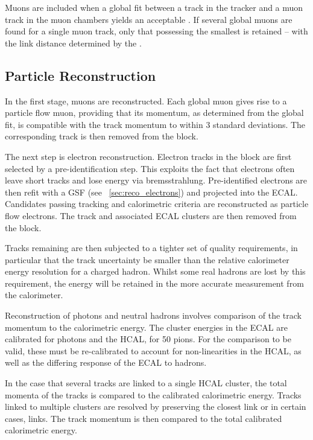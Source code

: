 Muons are included when a global fit between a track in the tracker and a muon
track in the muon chambers yields an acceptable \chisq. If several global muons
are found for a single muon track, only that possessing the smallest \chisq is
retained -- with the link distance determined by the \chisq.

\subsection{Particle Reconstruction}
In the first stage, muons are reconstructed. Each global muon gives rise to a
particle flow muon, providing that its momentum, as determined from the global
fit, is compatible with the track momentum to within 3 standard deviations. The
corresponding track is then removed from the block.

The next step is electron reconstruction. Electron tracks in the block are first
selected by a pre-identification step. This exploits the fact that electrons
often leave short tracks and lose energy via bremsstrahlung. Pre-identified
electrons are then refit with a \ac{GSF} (see \sec~\ref{sec:reco_electrons}) and
projected into the \ac{ECAL}.  Candidates passing tracking and calorimetric
criteria are reconstructed as particle flow electrons. The track and associated
\ac{ECAL} clusters are then removed from the block.

Tracks remaining are then subjected to a tighter set of quality requirements, in
particular that the track \Pt uncertainty be smaller than the relative
calorimeter energy resolution for a charged hadron. Whilst some real hadrons are
lost by this requirement, the energy will be retained in the more accurate
measurement from the calorimeter.

Reconstruction of photons and neutral hadrons involves comparison of the track
momentum to the calorimetric energy. The cluster energies in the \ac{ECAL} are
calibrated for photons and the \ac{HCAL}, for \unit{50}{\GeV} pions. For the
comparison to be valid, these must be re-calibrated to account for
non-linearities in the \ac{HCAL}, as well as the differing response of the
\ac{ECAL} to hadrons.

In the case that several tracks are linked to a single \ac{HCAL} cluster, the
total momenta of the tracks is compared to the calibrated calorimetric energy.
Tracks linked to multiple clusters are resolved by preserving the closest link
or in certain cases, links. The track momentum is then compared to the total
calibrated calorimetric energy.

